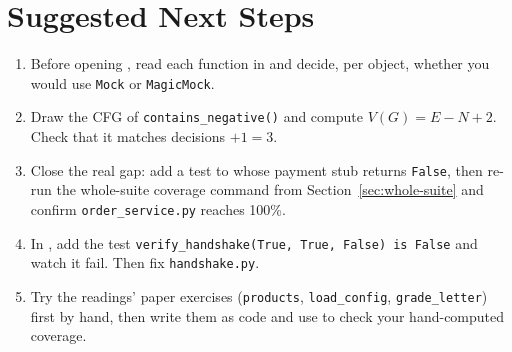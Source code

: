 \documentclass[11pt]{article}
\begin{document}
\section{Suggested Next Steps}
\begin{enumerate}
\item Before opening , read
each function in  and decide,
per object, whether you would use \texttt{Mock} or \texttt{MagicMock}.
\item Draw the CFG of \texttt{contains\_negative()} and compute
\(V(G) = E - N + 2\). Check that it matches decisions \(+ 1 = 3\).
\item Close the real gap: add a test to
 whose payment stub returns
\texttt{False}, then re-run the whole-suite coverage command from
Section~\ref{sec:whole-suite} and confirm \texttt{order\_service.py} reaches 100\%.
\item In , add the test
\texttt{verify\_handshake(True, True, False) is False} and watch it
fail. Then fix \texttt{handshake.py}.
\item Try the readings' paper exercises (\texttt{products},
\texttt{load\_config}, \texttt{grade\_letter}) first by hand, then
write them as code and use  to check your
hand-computed coverage.
\end{enumerate}
\end{document}
